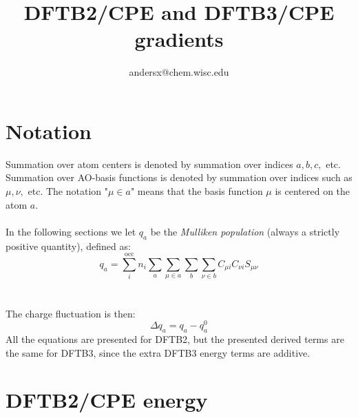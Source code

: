 \documentclass{article}
\title{DFTB2/CPE and DFTB3/CPE gradients}
\author{andersx@chem.wisc.edu}
\numberwithin{equation}{section}
\begin{document}
\section{Notation}
Summation over atom centers is denoted by summation over indices $a, b, c,$ etc. Summation over AO-basis functions is denoted by summation over indices such as $\mu, \nu,$ etc. The notation "$\mu \in a$" means that the basis function $\mu$ is centered on the atom $a$.
\\\\In the following sections we let $q_a$ be the \textit{Mulliken population} (always a strictly positive quantity), defined as:
\begin{equation}
    q_a = \sum_i^\mathrm{occ} n_i \sum_a \sum_{\mu \in a} \sum_b \sum_{\nu \in b}
    C_{\mu i} C_{\nu i} S_{\mu\nu}
\end{equation}
\\\\The charge fluctuation is then: 
\begin{equation}
    \Delta q_a = q_a - q_a^0
\end{equation}
All the equations are presented for DFTB2, but the presented derived terms are the same for DFTB3, since the extra DFTB3 energy terms are additive.

\section{DFTB2/CPE energy}
\end{document}
